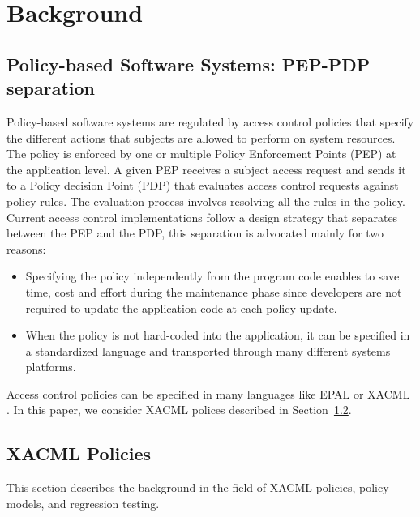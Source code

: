
  
\section{Background}
\label{sec:background}
\subsection{Policy-based Software Systems: PEP-PDP separation}
Policy-based software systems are regulated by access control policies that specify the different actions that subjects are allowed to perform on system resources. 
The policy is enforced by one or multiple Policy Enforcement Points (PEP) at the application level. A given PEP receives a subject access request and 
sends it to a Policy decision Point (PDP) that evaluates access control requests against policy rules. The evaluation process involves resolving all the rules in the policy. 
Current access control implementations follow a design strategy that separates between the PEP and the PDP, this separation is advocated mainly for two reasons:
\begin{itemize}
\item Specifying the policy independently from the program code enables to save time, cost and effort during the maintenance phase since developers are not required 
to update the application code at each policy update.
\item When the policy is not hard-coded into the application, it can be specified in a standardized language and transported through many different systems platforms.
\end{itemize}
Access control policies can be specified in many languages like EPAL \cite{epal} or XACML \cite {oasis05:xacml}. 
In this paper, we consider XACML polices described in Section~\ref{sec:xacmlpolicies}.


\subsection{XACML Policies} \label{sec:xacmlpolicies}
This section describes the background in the field of XACML policies, policy models, and regression testing.

